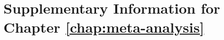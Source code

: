 \chapter{Supplementary Information for Chapter \ref{chap:meta-analysis}}

\graphicspath{{meta-analysis/figures/}}


